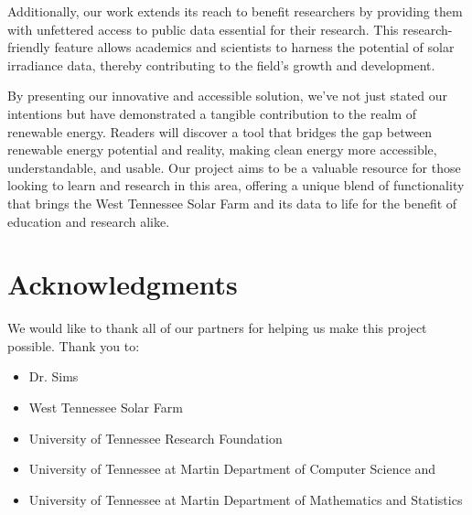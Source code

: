 \documentclass{sigchi}
\begin{document}
Additionally, our work extends its reach to benefit researchers by providing them with unfettered access to public data essential for their research. This research-friendly feature allows academics and scientists to harness the potential of solar irradiance data, thereby contributing to the field's growth and development.

By presenting our innovative and accessible solution, we've not just stated our intentions but have demonstrated a tangible contribution to the realm of renewable energy. Readers will discover a tool that bridges the gap between renewable energy potential and reality, making clean energy more accessible, understandable, and usable. Our project aims to be a valuable resource for those looking to learn and research in this area, offering a unique blend of functionality that brings the West Tennessee Solar Farm and its data to life for the benefit of education and research alike.

\section{Acknowledgments}

We would like to thank all of our partners for helping us make this project possible. Thank you to:
\begin{itemize}
    \item Dr. Sims
    \item West Tennessee Solar Farm
    \item University of Tennessee Research Foundation
    \item University of Tennessee at Martin Department of Computer Science and
    \item University of Tennessee at Martin Department of Mathematics and Statistics
\end{itemize}
\balance{}

\balance{}




\end{document}

